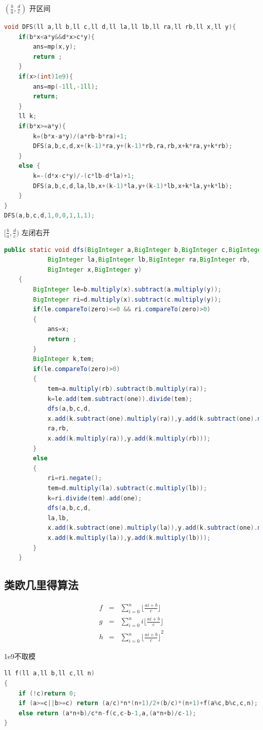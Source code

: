 \documentclass[UTF8,a4paper,titlepage]{ctexart}
\begin{document}
$(\frac{b}{a},\frac{d}{c})$ 开区间
\begin{lstlisting}[language=C++]
void DFS(ll a,ll b,ll c,ll d,ll la,ll lb,ll ra,ll rb,ll x,ll y){
	if(b*x<a*y&&d*x>c*y){
		ans=mp(x,y);
		return ;
	}
	if(x>(int)1e9){
		ans=mp(-1ll,-1ll);
		return;
	}
	ll k;
	if(b*x>=a*y){
		k=(b*x-a*y)/(a*rb-b*ra)+1;
		DFS(a,b,c,d,x+(k-1)*ra,y+(k-1)*rb,ra,rb,x+k*ra,y+k*rb);
	}
	else {
        k=-(d*x-c*y)/-(c*lb-d*la)+1;
		DFS(a,b,c,d,la,lb,x+(k-1)*la,y+(k-1)*lb,x+k*la,y+k*lb);
	}
}
DFS(a,b,c,d,1,0,0,1,1,1);
\end{lstlisting}
$[\frac{b}{a},\frac{d}{c})$ 左闭右开
\begin{lstlisting}[language=Java]
public static void dfs(BigInteger a,BigInteger b,BigInteger c,BigInteger d,
    		BigInteger la,BigInteger lb,BigInteger ra,BigInteger rb,
    		BigInteger x,BigInteger y)
    {
        BigInteger le=b.multiply(x).subtract(a.multiply(y));
        BigInteger ri=d.multiply(x).subtract(c.multiply(y));
        if(le.compareTo(zero)<=0 && ri.compareTo(zero)>0)
        {
            ans=x;
            return ;
        }
        BigInteger k,tem;
        if(le.compareTo(zero)>0)
        {
            tem=a.multiply(rb).subtract(b.multiply(ra));
            k=le.add(tem.subtract(one)).divide(tem);
            dfs(a,b,c,d,
            x.add(k.subtract(one).multiply(ra)),y.add(k.subtract(one).multiply(rb)),
            ra,rb,
            x.add(k.multiply(ra)),y.add(k.multiply(rb)));
        }
        else
        {
            ri=ri.negate();
            tem=d.multiply(la).subtract(c.multiply(lb));
            k=ri.divide(tem).add(one);
            dfs(a,b,c,d,
            la,lb,
            x.add(k.subtract(one).multiply(la)),y.add(k.subtract(one).multiply(lb)),
            x.add(k.multiply(la)),y.add(k.multiply(lb)));
        }
    }
\end{lstlisting}
        \subsection{类欧几里得算法}
\begin{eqnarray*}
f&=&\sum_{i=0}^n\lfloor\frac{ai+b}{c}\rfloor\\
g&=&\sum_{i=0}^ni\lfloor\frac{ai+b}{c}\rfloor\\
h&=&\sum_{i=0}^n{\lfloor\frac{ai+b}{c}\rfloor}^2
\end{eqnarray*}

1e9不取模
\begin{lstlisting}[language=C++]
ll f(ll a,ll b,ll c,ll n)
{
    if (!c)return 0;
    if (a>=c||b>=c) return (a/c)*n*(n+1)/2+(b/c)*(n+1)+f(a%c,b%c,c,n);
    else return (a*n+b)/c*n-f(c,c-b-1,a,(a*n+b)/c-1);
}
\end{lstlisting}
\end{document}
